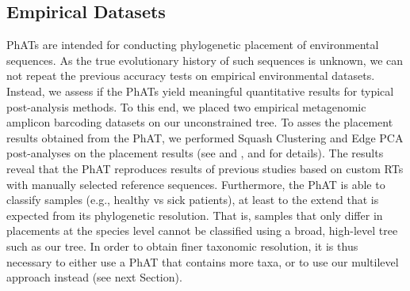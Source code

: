 

\subsection{Empirical Datasets}
\label{ch:AutomaticTrees:sec:Evaluationsub:EmpiricalDatasets}

\acp{PhAT} are intended for conducting phylogenetic placement of environmental sequences.
As the true evolutionary history of such sequences is unknown,
we can not repeat the previous accuracy tests on empirical environmental datasets.
Instead, we assess if the \acp{PhAT} yield meaningful quantitative results for typical post-analysis methods.
To this end, we placed two empirical metagenomic amplicon barcoding datasets on our unconstrained  tree.
To asses the placement results obtained from the \ac{PhAT},
we performed Squash Clustering and Edge PCA \citep{Matsen2011a} post-analyses on the placement results
(see  and
,  and  for details).
The results reveal that the \ac{PhAT} reproduces results of previous studies
based on custom \acp{RT} with manually selected reference sequences.
Furthermore, the \ac{PhAT} is able to classify samples (e.g., healthy vs sick patients),
at least to the extend that is expected from its phylogenetic resolution.
That is, samples that only differ in placements at the species level
cannot be classified using a broad, high-level tree such as our  tree.
In order to obtain finer taxonomic resolution, it is thus necessary to either use a \ac{PhAT} that contains more taxa,
or to use our multilevel approach instead (see next Section).


